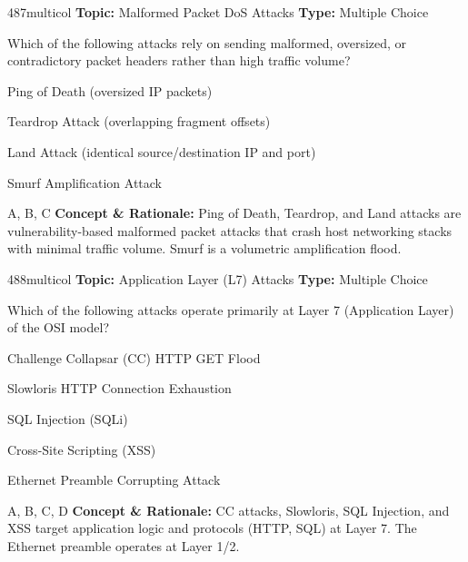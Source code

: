 \begin{qcard}{487}{multicol}
\textcolor{darkslate!75}{\small\textbf{Topic:} Malformed Packet DoS Attacks \hfill \textbf{Type:} Multiple Choice}\vspace{0.4em}\par
Which of the following attacks rely on sending malformed, oversized, or contradictory packet headers rather than high traffic volume?
\begin{qoptions}
\item Ping of Death (oversized IP packets)
\item Teardrop Attack (overlapping fragment offsets)
\item Land Attack (identical source/destination IP and port)
\item Smurf Amplification Attack
\end{qoptions}
\end{qcard}
\nopagebreak
\begin{explainbox}{A, B, C}
\textbf{Concept \& Rationale:} Ping of Death, Teardrop, and Land attacks are vulnerability-based malformed packet attacks that crash host networking stacks with minimal traffic volume. Smurf is a volumetric amplification flood.
\end{explainbox}

\begin{qcard}{488}{multicol}
\textcolor{darkslate!75}{\small\textbf{Topic:} Application Layer (L7) Attacks \hfill \textbf{Type:} Multiple Choice}\vspace{0.4em}\par
Which of the following attacks operate primarily at Layer 7 (Application Layer) of the OSI model?
\begin{qoptions}
\item Challenge Collapsar (CC) HTTP GET Flood
\item Slowloris HTTP Connection Exhaustion
\item SQL Injection (SQLi)
\item Cross-Site Scripting (XSS)
\item Ethernet Preamble Corrupting Attack
\end{qoptions}
\end{qcard}
\nopagebreak
\begin{explainbox}{A, B, C, D}
\textbf{Concept \& Rationale:} CC attacks, Slowloris, SQL Injection, and XSS target application logic and protocols (HTTP, SQL) at Layer 7. The Ethernet preamble operates at Layer 1/2.
\end{explainbox}

